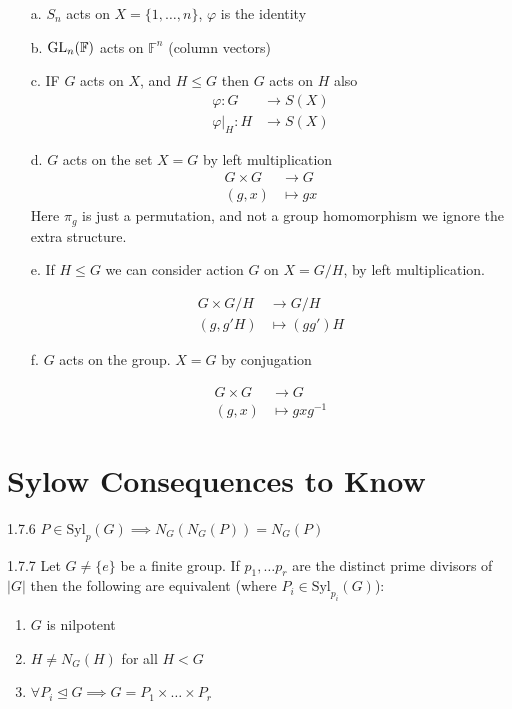 \documentclass[11pt,leqno,oneside]{amsart}
\newcommand{\lambdadeclaration}[4]{
  \begin{align*}
              #1 &\to #2\\
              #3 &\mapsto #4
  \end{align*}
}
\begin{document}
\begin{example}[1.5.4]
  \begin{enumerate}
    \item[a.] \(S_n\) acts on \(X=\{1,\ldots,n\}\), \(\varphi\) is the identity
    \item[b.] \(\operatorname{GL}_n(\mathbb{F})\) acts on \(\mathbb{F}^n\) (column vectors)
    \item[c.] IF \(G\) acts on \(X\), and \(H \le G\) then \(G\) acts on \(H\) also
      \begin{align*}
        \varphi \colon G &\to S(X)\\
        \varphi|_H \colon H &\to S(X)
      \end{align*}
    \item[d.] \(G\) acts on the set \(X=G\) by left multiplication
      \begin{align*}
        G \times G &\to G\\
        (g,x) &\mapsto gx
      \end{align*}
      Here \(\pi_g\) is just a permutation, and not a group homomorphism we ignore the extra structure.
    \item[e.] If \(H \le G\) we can consider action \(G\) on \(X=G/H\), by left multiplication.
      \lambdadeclaration{G\times G/H}{G/H}{(g,g'H)}{(gg')H}
    \item[f.] \(G\) acts on the group. \(X=G\) by conjugation
      \lambdadeclaration{G \times G}{G}{(g,x)}{gxg^{-1}}
  \end{enumerate}
\end{example}


\newpage
\section{Sylow Consequences to Know}
\newcommand{\syl}{\text{Syl}}
\begin{prop*}{1.7.6}
  \(P \in \syl_p(G) \implies N_G(N_G(P))=N_G(P)\)
\end{prop*}

\begin{thm*}{1.7.7}
  Let \(G \neq \{e\}\) be a finite group. If \(p_1, \ldots p_r\) are the distinct prime divisors of \(|G|\) then the
  following are equivalent (where \(P_i \in \syl_{p_i}(G)\)):
  \begin{enumerate}
  \item \(G\) is nilpotent
  \item \(H \neq N_G(H)\) for all \(H < G\)
  \item \(\forall P_i \unlhd G \implies G = P_1 \times \ldots \times P_r\) 
  \end{enumerate}
\end{thm*}
\end{document}

